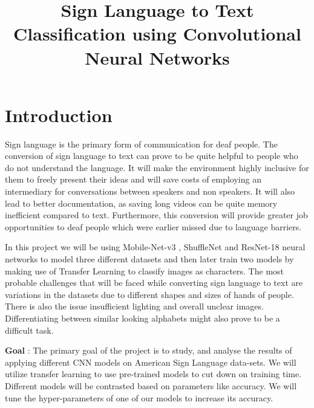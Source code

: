 \documentclass[10pt,twocolumn,letterpaper]{article}
\begin{document}
  \title{Sign Language to Text Classification using Convolutional Neural Networks}
  
  \maketitle


  \section{Introduction}
  \label{sec:intro}

Sign language is the primary form of communication for deaf people. The conversion of sign language to text can prove to be quite helpful to people who do not understand the language\cite{IMP3}. It will make the environment highly inclusive for them to freely present their ideas\cite{IMP2} and will save costs of employing an intermediary for conversations between speakers and non speakers\cite{IMP1}. It will also lead to better documentation, as saving long videos can be quite memory inefficient compared to text. Furthermore, this conversion will provide greater job opportunities to deaf people which were earlier missed due to language barriers. 
\par
In this project we will be using Mobile-Net-v3 \cite{MNV3}, ShuffleNet \cite{SN1} and ResNet-18 \cite{RN18} neural networks to model three different datasets and then later train two models by making use of Transfer Learning to classify images as characters. The most probable challenges that will be faced while converting sign language to text are variations in the datasets due to different shapes and sizes of hands of people\cite{C}. There is also the issue insufficient lighting and overall unclear images. Differentiating between similar looking alphabets might also prove to be a difficult task.
\par
{\bfseries Goal} : The primary goal of the project is to study, and analyse the results of applying different CNN models on American Sign Language data-sets. We will utilize transfer learning to use pre-trained models to cut down on training time. Different models will be contrasted based on parameters like accuracy. We will tune the hyper-parameters of one of our models to increase its accuracy. 


\end{document}
